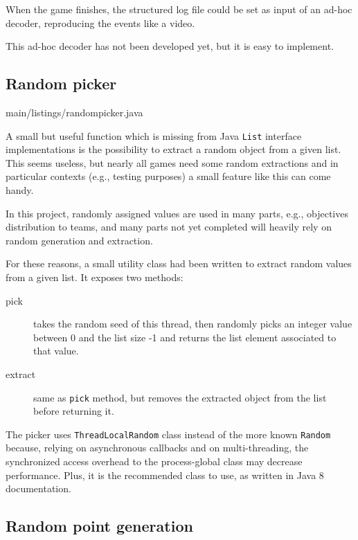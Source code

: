 			When the game finishes, the structured log file could be set as input of an ad-hoc decoder, reproducing the events like a video.
			
			This ad-hoc decoder has not been developed yet, but it is easy to implement. 
		
		\newpage
		
		\subsection{Random picker}\label{focus:picker}
		
			
							{main/listings/randompicker.java}
			
			A small but useful function which is missing from Java \lstinline|List| interface implementations is the possibility to extract a random object from a given list.
			This seems useless, but nearly all games need some random extractions and in particular contexts (e.g., testing purposes) a small feature like this can come handy.
			
			In this project, randomly assigned values are used in many parts, e.g., objectives distribution to teams, and many parts not yet completed will heavily rely on random generation and extraction.
			
			For these reasons, a small utility class had been written to extract random values from a given list. It exposes two methods:
			\begin{description}
				\item[pick] takes the random seed of this thread, then randomly picks an integer value between 0 and the list size -1 and returns the list element associated to that value. 
				\item[extract] same as \lstinline|pick| method, but removes the extracted object from the list before returning it.
			\end{description}
		
			The picker uses \lstinline|ThreadLocalRandom| class instead of the more known \lstinline|Random| because, relying on asynchronous callbacks and on multi-threading, the synchronized access overhead to the process-global class may decrease performance.
			Plus, it is the recommended class to use, as written in Java 8 documentation.
						
		\subsection{Random point generation}\label{focus:point}
			
